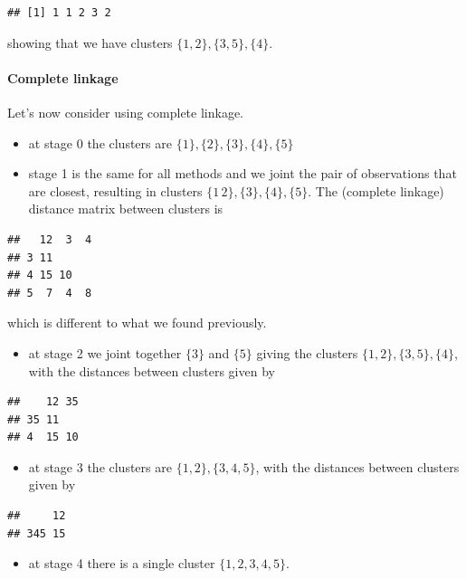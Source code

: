 \documentclass[
]{book}
\providecommand{\tightlist}{%
  \setlength{\itemsep}{0pt}\setlength{\parskip}{0pt}}
\theoremstyle{definition}
\theoremstyle{definition}
\theoremstyle{definition}
\theoremstyle{definition}
\theoremstyle{remark}
\begin{document}
\begin{verbatim}
## [1] 1 1 2 3 2
\end{verbatim}

showing that we have clusters \(\{1,2\}, \{3,5\}, \{4\}\).

\hypertarget{complete-linkage}{%
\paragraph*{Complete linkage}\label{complete-linkage}}

Let's now consider using complete linkage.

\begin{itemize}
\item
  at stage 0 the clusters are \(\{1\}, \{2\},\{3\},\{4\},\{5\}\)
\item
  stage 1 is the same for all methods and we joint the pair of observations that are closest, resulting in clusters \(\{1\, 2\},\{3\},\{4\},\{5\}\). The (complete linkage) distance matrix between clusters is
\end{itemize}

\begin{verbatim}
##   12  3  4
## 3 11      
## 4 15 10   
## 5  7  4  8
\end{verbatim}

which is different to what we found previously.

\begin{itemize}
\tightlist
\item
  at stage 2 we joint together \(\{3\}\) and \(\{5\}\) giving the clusters \(\{1, 2\},\{3, 5\},\{4\}\), with the distances between clusters given by
\end{itemize}

\begin{verbatim}
##    12 35
## 35 11   
## 4  15 10
\end{verbatim}

\begin{itemize}
\tightlist
\item
  at stage 3 the clusters are \(\{1, 2\},\{3, 4, 5\}\), with the distances between clusters given by
\end{itemize}

\begin{verbatim}
##     12
## 345 15
\end{verbatim}

\begin{itemize}
\tightlist
\item
  at stage 4 there is a single cluster \(\{1, 2, 3, 4, 5\}\).
\end{itemize}
\end{document}
